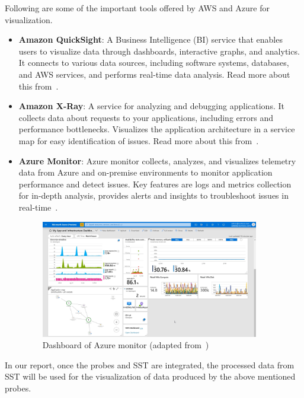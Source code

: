 Following are some of the important tools offered by AWS and Azure for visualization.
\begin{itemize}[label=$\bullet$]
	\item \textbf{Amazon QuickSight}: A Business Intelligence (BI) service that enables users to visualize data through dashboards, interactive graphs, and analytics. It connects to various data sources, including software systems, databases, and AWS services, and performs real-time data analysis. Read more about this from~\citep{AWSQuickSight2025}. 
	\item \textbf{Amazon X-Ray}: A service for analyzing and debugging applications. It collects data about requests to your applications, including errors and performance bottlenecks. Visualizes the application architecture in a service map for easy identification of issues. Read more about this from~\citep{AWSXRay2025}.
	\item \textbf{Azure Monitor}: Azure monitor collects, analyzes, and visualizes telemetry data from Azure and on-premise environments to monitor application performance and detect issues. Key features are logs and metrics collection for in-depth analysis, provides alerts and insights to troubleshoot issues in real-time~\citep{AzureMonitor2025}.
	
	\begin{figure}[H]
		\centering
		\includegraphics[width=0.9\textwidth]{figures/azure_monitor_dashboard.png}
		\caption[Dashboard of Azure monitor]{Dashboard of Azure monitor (adapted from~\citep{AzureMonitorBestPractices2025})}
		\label{fig_azure_monitor}
	\end{figure}

\end{itemize}

In our report, once the probes and SST are integrated, the processed data from SST will be used for the visualization of data produced by the above mentioned probes. 